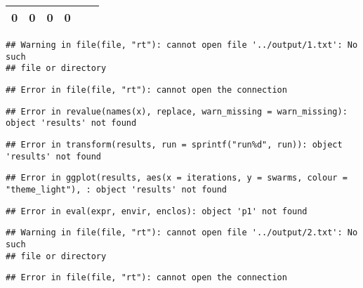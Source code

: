\documentclass[12pt,a4paper]{article}
\begin{document}
\begin{longtable}[c]{@{}cccccc@{}}
\begin{minipage}[t]{0.06\columnwidth}\centering\strut
0
\strut\end{minipage} &
\begin{minipage}[t]{0.06\columnwidth}\centering\strut
0
\strut\end{minipage} &
\begin{minipage}[t]{0.06\columnwidth}\centering\strut
0
\strut\end{minipage} &
\begin{minipage}[t]{0.06\columnwidth}\centering\strut
0
\strut\end{minipage}\tabularnewline
\bottomrule
\end{longtable}

\begin{verbatim}
## Warning in file(file, "rt"): cannot open file '../output/1.txt': No such
## file or directory
\end{verbatim}

\begin{verbatim}
## Error in file(file, "rt"): cannot open the connection
\end{verbatim}

\begin{verbatim}
## Error in revalue(names(x), replace, warn_missing = warn_missing): object 'results' not found
\end{verbatim}

\begin{verbatim}
## Error in transform(results, run = sprintf("run%d", run)): object 'results' not found
\end{verbatim}

\begin{verbatim}
## Error in ggplot(results, aes(x = iterations, y = swarms, colour = "theme_light"), : object 'results' not found
\end{verbatim}

\begin{verbatim}
## Error in eval(expr, envir, enclos): object 'p1' not found
\end{verbatim}

\begin{verbatim}
## Warning in file(file, "rt"): cannot open file '../output/2.txt': No such
## file or directory
\end{verbatim}

\begin{verbatim}
## Error in file(file, "rt"): cannot open the connection
\end{verbatim}
\end{document}
